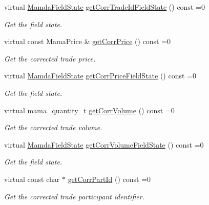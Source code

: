 \begin{CompactItemize}
virtual \hyperlink{namespaceWombat_93aac974f2ab713554fd12a1fa3b7d2a}{Mamda\-Field\-State} \hyperlink{classWombat_1_1MamdaTradeCorrection_a00b0ac006b165b500fb5e97f1852c1a}{get\-Corr\-Trade\-Id\-Field\-State} () const =0
\begin{CompactList}\small\item\em Get the field state. \item\end{CompactList}\item 
virtual const Mama\-Price \& \hyperlink{classWombat_1_1MamdaTradeCorrection_0f93bfcc5a56537cc99a48238e9e6e49}{get\-Corr\-Price} () const =0
\begin{CompactList}\small\item\em Get the corrected trade price. \item\end{CompactList}\item 
virtual \hyperlink{namespaceWombat_93aac974f2ab713554fd12a1fa3b7d2a}{Mamda\-Field\-State} \hyperlink{classWombat_1_1MamdaTradeCorrection_16c47d622b0ed701f3f1fad4a9219a57}{get\-Corr\-Price\-Field\-State} () const =0
\begin{CompactList}\small\item\em Get the field state. \item\end{CompactList}\item 
virtual mama\_\-quantity\_\-t \hyperlink{classWombat_1_1MamdaTradeCorrection_39f75a7442d2c2a507f491b323536eaf}{get\-Corr\-Volume} () const =0
\begin{CompactList}\small\item\em Get the corrected trade volume. \item\end{CompactList}\item 
virtual \hyperlink{namespaceWombat_93aac974f2ab713554fd12a1fa3b7d2a}{Mamda\-Field\-State} \hyperlink{classWombat_1_1MamdaTradeCorrection_bf9f519809865d458b8f8daeb0391eb9}{get\-Corr\-Volume\-Field\-State} () const =0
\begin{CompactList}\small\item\em Get the field state. \item\end{CompactList}\item 
virtual const char $\ast$ \hyperlink{classWombat_1_1MamdaTradeCorrection_221aff95289be7e4a10043b045eba11b}{get\-Corr\-Part\-Id} () const =0
\begin{CompactList}\small\item\em Get the corrected trade participant identifier. \item\end{CompactList}\item 

\end{CompactItemize}
